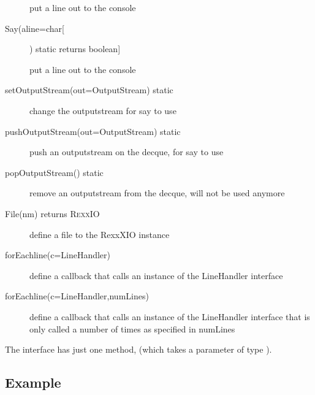 \begin{description}
put a line out to the console
  \item[Say(aline=char[]) static returns boolean]

put a line out to the console
  \item[setOutputStream(out=OutputStream) static]

change the outputstream for say to use  
 
\item[pushOutputStream(out=OutputStream) static]


push an outputstream on the decque, for say to use
  \item[popOutputStream() static]

remove an outputstream from the decque, will not be used anymore
  \item[File(nm) returns R\textsc{exx}IO]

define a file to the RexxXIO instance
  \item[forEachline(c=LineHandler)]

define a callback that calls an instance of the LineHandler interface
  \item[forEachline(c=LineHandler,numLines)]

define a callback that calls an instance of the LineHandler interface that is only called a number of times as specified in numLines
\end{description}
The  interface has just one method,
 (which takes a parameter of type ).

\subsection{Example}


